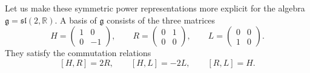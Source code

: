 \documentclass[12pt,reqno]{book}%
\theoremstyle{definition}
\theoremstyle{remark}
\theoremstyle{theorem}
\theoremstyle{remark}
\begin{document}
Let us make these symmetric power representations more explicit for the algebra $\mathfrak{g} = \mathfrak{sl}(2, \mathbb{R})$.
A basis of $\mathfrak{g}$ consists of the three matrices
\[
    H = \begin{pmatrix}
        1 & 0  \\
        0 & -1
    \end{pmatrix}, \qquad R = \begin{pmatrix}
        0 & 1  \\
        0 & 0
    \end{pmatrix}, \qquad L = \begin{pmatrix}
        0 & 0  \\
        1 & 0
    \end{pmatrix}.
\]
They satisfy the commutation relations
\begin{equation}\label{eq12.1}
    [H, R] = 2R, \qquad [H, L] = -2L, \qquad [R, L] = H.
\end{equation}
\end{document}
